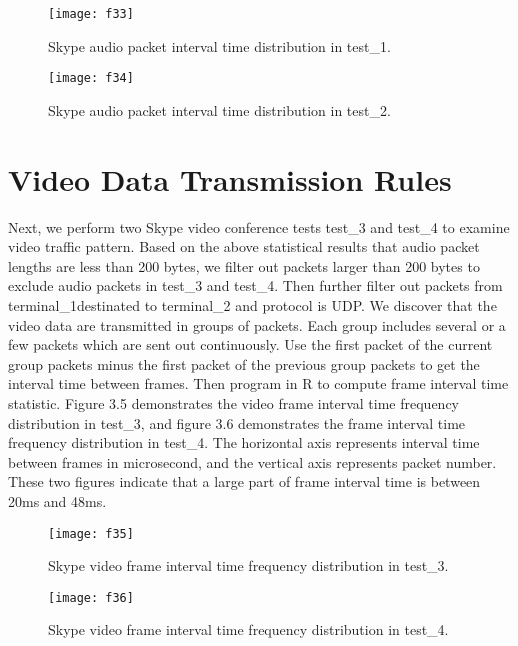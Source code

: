 \documentclass[master]{thesis}
\begin{document}
\begin{figure}[htp]
    \texttt{[image: f33]}
    \caption[Skype audio packet interval time distribution in test\_1.]{Skype audio packet interval time distribution in test\_1.}
    \label{fig:f33}
\end{figure}

\begin{figure}[htp]
    \texttt{[image: f34]}
    \caption[Skype audio packet interval time distribution in test\_2.]{Skype audio packet interval time distribution in test\_2.}
    \label{fig:f34}
\end{figure}

\section{Video Data Transmission Rules}

Next, we perform two Skype video conference tests test\_3 and test\_4 to examine video traffic pattern. Based on the above statistical results that audio packet lengths are less than 200 bytes, we filter out packets larger than 200 bytes to exclude audio packets in test\_3 and test\_4. Then further filter out packets from terminal\_1destinated to terminal\_2 and protocol is UDP. We discover that the video data are transmitted in groups of packets. Each group includes several or a few packets which are sent out continuously. Use the first packet of the current group packets minus the first packet of the previous group packets to get the interval time between frames. Then program in R to compute frame interval time statistic. Figure 3.5 demonstrates the video frame interval time frequency distribution in test\_3, and figure 3.6 demonstrates the frame interval time frequency distribution in test\_4. The horizontal axis represents interval time between frames in microsecond, and the vertical axis represents packet number. These two figures indicate that a large part of frame interval time is between 20ms and 48ms.

\begin{figure}[htp]
    \texttt{[image: f35]}
    \caption[Skype video frame interval time frequency distribution in test\_3.]{Skype video frame interval time frequency distribution in test\_3.}
    \label{fig:f35}
\end{figure}

\begin{figure}[htp]
    \texttt{[image: f36]}
    \caption[Skype video frame interval time frequency distribution in test\_4.]{Skype video frame interval time frequency distribution in test\_4.}
    \label{fig:f36}
\end{figure}
\end{document}
